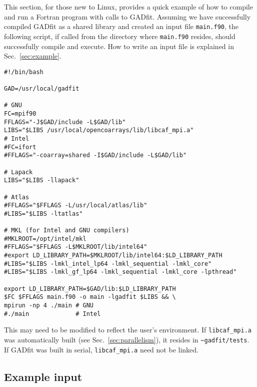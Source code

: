 \documentclass{article}
\begin{document}
This section, for those new to Linux, provides a quick example of how to compile and run a Fortran program with calls to GADfit. Assuming we have successfully compiled GADfit as a shared library and created an input file \verb+main.f90+, the following script, if called from the directory where \verb+main.f90+ resides, should successfully compile and execute. How to write an input file is explained in Sec.~\ref{sec:example}.
\begin{verbatim}
#!/bin/bash

GAD=/usr/local/gadfit

# GNU
FC=mpif90
FFLAGS="-J$GAD/include -L$GAD/lib"
LIBS="$LIBS /usr/local/opencoarrays/lib/libcaf_mpi.a"
# Intel
#FC=ifort
#FFLAGS="-coarray=shared -I$GAD/include -L$GAD/lib"

# Lapack
LIBS="$LIBS -llapack"

# Atlas
#FFLAGS="$FFLAGS -L/usr/local/atlas/lib"
#LIBS="$LIBS -ltatlas"

# MKL (for Intel and GNU compilers)
#MKLROOT=/opt/intel/mkl
#FFLAGS="$FFLAGS -L$MKLROOT/lib/intel64"
#export LD_LIBRARY_PATH=$MKLROOT/lib/intel64:$LD_LIBRARY_PATH
#LIBS="$LIBS -lmkl_intel_lp64 -lmkl_sequential -lmkl_core"
#LIBS="$LIBS -lmkl_gf_lp64 -lmkl_sequential -lmkl_core -lpthread"

export LD_LIBRARY_PATH=$GAD/lib:$LD_LIBRARY_PATH
$FC $FFLAGS main.f90 -o main -lgadfit $LIBS && \
mpirun -np 4 ./main # GNU
#./main             # Intel
\end{verbatim}
This may need to be modified to reflect the user's environment. If \verb+libcaf_mpi.a+ was automatically built (see Sec.~\ref{sec:parallelism}), it resides in \verb+~gadfit/tests+. If GADfit was built in serial, \verb+libcaf_mpi.a+ need not be linked.

\subsection{\label{sec:example}Example input}
\end{document}
